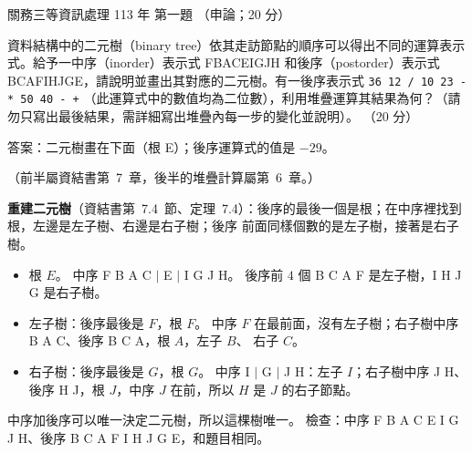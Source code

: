 \begin{pastexam}[label={px:gw3-113-ds-01}]{關務三等資訊處理 113 年 第一題}
（申論；20 分）

資料結構中的二元樹（binary tree）依其走訪節點的順序可以得出不同的運算表示式。給予一中序（inorder）表示式 FBACEIGJH
和後序（postorder）表示式 BCAFIHJGE，請說明並畫出其對應的二元樹。有一後序表示式 \texttt{36 12 / 10 23 - * 50 40 - +}
（此運算式中的數值均為二位數），利用堆疊運算其結果為何？（請勿只寫出最後結果，需詳細寫出堆疊內每一步的變化並說明）。
（20 分）
\end{pastexam}

\begin{pastsoln}
答案：二元樹畫在下面（根 E）；後序運算式的值是 $-29$。

（前半屬資結書第~7~章，後半的堆疊計算屬第~6~章。）

\textbf{重建二元樹}（資結書第~7.4~節、定理~7.4）：後序的最後一個是根；在中序裡找到根，左邊是左子樹、右邊是右子樹；後序
前面同樣個數的是左子樹，接著是右子樹。
\begin{itemize}
\item 根 $E$。 中序 F B A C $\mid$ E $\mid$ I G J H。 後序前 $4$ 個 B C A F 是左子樹，I H J G 是右子樹。
\item 左子樹：後序最後是 $F$，根 $F$。 中序 $F$ 在最前面，沒有左子樹；右子樹中序 B A C、後序 B C A，根 $A$，左子 $B$、
右子 $C$。
\item 右子樹：後序最後是 $G$，根 $G$。 中序 I $\mid$ G $\mid$ J H：左子 $I$；右子樹中序 J H、後序 H J，根 $J$，中序 $J$
在前，所以 $H$ 是 $J$ 的右子節點。
\end{itemize}
\begin{center}
\end{center}
中序加後序可以唯一決定二元樹，所以這棵樹唯一。 檢查：中序 F B A C E I G J H、後序 B C A F I H J G E，和題目相同。


\end{pastsoln}
